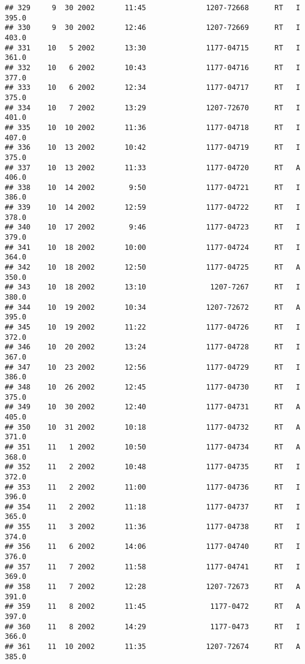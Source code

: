 \documentclass[
]{article}
\begin{document}
\begin{verbatim}
## 329     9  30 2002       11:45              1207-72668      RT   I     395.0
## 330     9  30 2002       12:46              1207-72669      RT   I     403.0
## 331    10   5 2002       13:30              1177-04715      RT   I     361.0
## 332    10   6 2002       10:43              1177-04716      RT   I     377.0
## 333    10   6 2002       12:34              1177-04717      RT   I     375.0
## 334    10   7 2002       13:29              1207-72670      RT   I     401.0
## 335    10  10 2002       11:36              1177-04718      RT   I     407.0
## 336    10  13 2002       10:42              1177-04719      RT   I     375.0
## 337    10  13 2002       11:33              1177-04720      RT   A     406.0
## 338    10  14 2002        9:50              1177-04721      RT   I     386.0
## 339    10  14 2002       12:59              1177-04722      RT   I     378.0
## 340    10  17 2002        9:46              1177-04723      RT   I     379.0
## 341    10  18 2002       10:00              1177-04724      RT   I     364.0
## 342    10  18 2002       12:50              1177-04725      RT   A     350.0
## 343    10  18 2002       13:10               1207-7267      RT   I     380.0
## 344    10  19 2002       10:34              1207-72672      RT   A     395.0
## 345    10  19 2002       11:22              1177-04726      RT   I     372.0
## 346    10  20 2002       13:24              1177-04728      RT   I     367.0
## 347    10  23 2002       12:56              1177-04729      RT   I     386.0
## 348    10  26 2002       12:45              1177-04730      RT   I     375.0
## 349    10  30 2002       12:40              1177-04731      RT   A     405.0
## 350    10  31 2002       10:18              1177-04732      RT   A     371.0
## 351    11   1 2002       10:50              1177-04734      RT   A     368.0
## 352    11   2 2002       10:48              1177-04735      RT   I     372.0
## 353    11   2 2002       11:00              1177-04736      RT   I     396.0
## 354    11   2 2002       11:18              1177-04737      RT   I     365.0
## 355    11   3 2002       11:36              1177-04738      RT   I     374.0
## 356    11   6 2002       14:06              1177-04740      RT   I     376.0
## 357    11   7 2002       11:58              1177-04741      RT   I     369.0
## 358    11   7 2002       12:28              1207-72673      RT   A     391.0
## 359    11   8 2002       11:45               1177-0472      RT   A     397.0
## 360    11   8 2002       14:29               1177-0473      RT   I     366.0
## 361    11  10 2002       11:35              1207-72674      RT   A     385.0

\end{verbatim}
\end{document}
